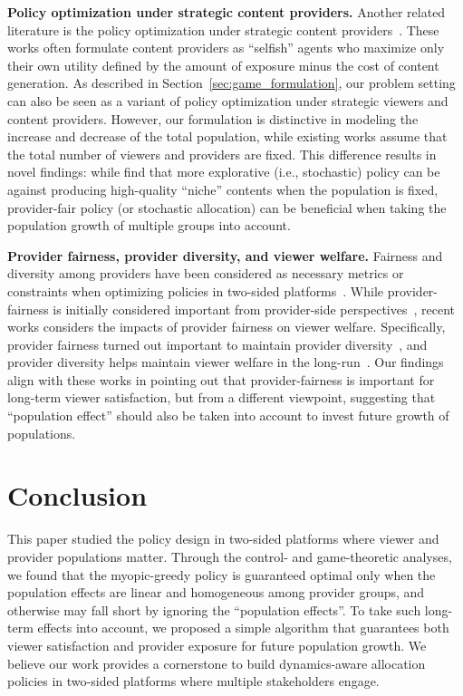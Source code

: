 \textbf{Policy optimization under strategic content providers.} \quad
Another related literature is the policy optimization under strategic content providers~\citep{hron2022modeling, jagadeesan2022supply,  yao2023rethinking}. These works often formulate content providers as ``selfish'' agents who maximize only their own utility defined by the amount of exposure minus the cost of content generation. As described in Section~\ref{sec:game_formulation}, our problem setting can also be seen as a variant of policy optimization under strategic viewers and content providers. However, our formulation is distinctive in modeling the increase and decrease of the total population, while existing works assume that the total number of viewers and providers are fixed. This difference results in novel findings: while \citet{hron2022modeling} find that more explorative (i.e., stochastic) policy can be against producing high-quality ``niche'' contents when the population is fixed, provider-fair policy (or stochastic allocation) can be beneficial when taking the population growth of multiple groups into account.

\textbf{Provider fairness, provider diversity, and viewer welfare.}
Fairness and diversity among providers have been considered as necessary metrics or constraints when optimizing policies in two-sided platforms~\citep{singh2018fairness, wang2021user, boutilier2023modeling}. While provider-fairness is initially considered important from provider-side perspectives~\citep{singh2018fairness}, recent works considers the impacts of provider fairness on viewer welfare. Specifically, provider fairness turned out important to maintain provider diversity~\citep{yao2023rethinking, hron2022modeling}, and provider diversity helps maintain viewer welfare in the long-run~\citep{su2023value, mladenov2020optimizing}. Our findings align with these works in pointing out that provider-fairness is important for long-term viewer satisfaction, but from a different viewpoint, suggesting that ``population effect'' should also be taken into account to invest future growth of populations.

\section{Conclusion}
This paper studied the 
policy design in two-sided platforms where viewer and provider populations matter. Through the control- and game-theoretic analyses, we found that the myopic-greedy policy is guaranteed optimal only when the population effects are linear and homogeneous among provider groups, and otherwise may fall short by ignoring the 
``population effects''. To take such long-term effects into account, we proposed a simple algorithm that guarantees both viewer satisfaction and provider exposure for future population growth.
We believe our work provides a cornerstone to build dynamics-aware allocation policies in two-sided platforms where multiple stakeholders engage.

